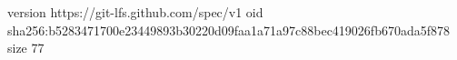 version https://git-lfs.github.com/spec/v1
oid sha256:b5283471700e23449893b30220d09faa1a71a97c88bec419026fb670ada5f878
size 77
